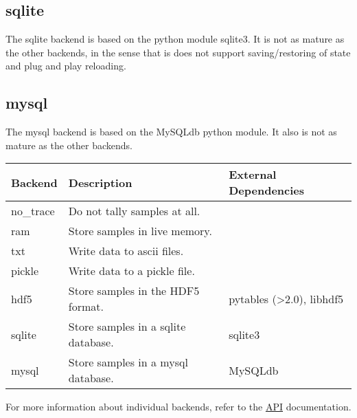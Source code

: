 \hypertarget{sqlite}{}
\subsection*{sqlite}
\label{sqlite}

The sqlite backend is based on the python module sqlite3. It is not as mature as the other backends, in the sense that is does not support saving/restoring of state and plug and play reloading.



\hypertarget{mysql}{}
\subsection*{mysql}
\label{mysql}

The mysql backend is based on the MySQLdb python module. It also is not as mature as the other backends.

\leavevmode
\begin{longtable}[c]{|p{0.133\locallinewidth}|p{0.447\locallinewidth}|p{0.307\locallinewidth}|}
\hline
\textbf{
Backend
} & \textbf{
Description
} & \textbf{
External Dependencies
} \\
\hline
\endhead

no{\_}trace
 & 
Do not tally samples at all.
 &  \\
\hline

ram
 & 
Store samples in live memory.
 &  \\
\hline

txt
 & 
Write data to ascii files.
 &  \\
\hline

pickle
 & 
Write data to a pickle file.
 &  \\
\hline

hdf5
 & 
Store samples in the HDF5 format.
 & 
pytables ({\textgreater}2.0), libhdf5
 \\
\hline

sqlite
 & 
Store samples in a sqlite database.
 & 
sqlite3
 \\
\hline

mysql
 & 
Store samples in a mysql database.
 & 
MySQLdb
 \\
\hline
\end{longtable}

For more information about individual backends, refer to the \href{docs/API.pdf}{API} documentation.

